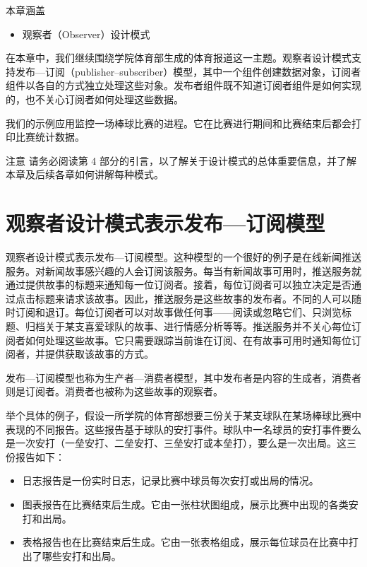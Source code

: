 \begin{myChapterIntro}{本章涵盖}
\begin{itemize}
\item 观察者（Observer）设计模式
\end{itemize}
\end{myChapterIntro}

在本章中，我们继续围绕学院体育部生成的体育报道这一主题。观察者设计模式支持发布—订阅（publisher–subscriber）模型，其中一个组件创建数据对象，订阅者组件以各自的方式独立处理这些对象。发布者组件既不知道订阅者组件是如何实现的，也不关心订阅者如何处理这些数据。

我们的示例应用监控一场棒球比赛的进程。它在比赛进行期间和比赛结束后都会打印比赛统计数据。


\begin{myWarning}{注意}
请务必阅读第 4 部分的引言，以了解关于设计模式的总体重要信息，并了解本章及后续各章如何讲解每种模式。
\end{myWarning}

\section{观察者设计模式表示发布—订阅模型}

观察者设计模式表示发布—订阅模型。这种模型的一个很好的例子是在线新闻推送服务。对新闻故事感兴趣的人会订阅该服务。每当有新闻故事可用时，推送服务就通过提供故事的标题来通知每一位订阅者。接着，每位订阅者可以独立决定是否通过点击标题来请求该故事。因此，推送服务是这些故事的发布者。不同的人可以随时订阅和退订。每位订阅者可以对故事做任何事——阅读或忽略它们、只浏览标题、归档关于某支喜爱球队的故事、进行情感分析等等。推送服务并不关心每位订阅者如何处理这些故事。它只需要跟踪当前谁在订阅、在有故事可用时通知每位订阅者，并提供获取该故事的方式。

发布—订阅模型也称为生产者—消费者模型，其中发布者是内容的生成者，消费者则是订阅者。消费者也被称为这些故事的观察者。

举个具体的例子，假设一所学院的体育部想要三份关于某支球队在某场棒球比赛中表现的不同报告。这些报告基于球队的安打事件。球队中一名球员的安打事件要么是一次安打（一垒安打、二垒安打、三垒安打或本垒打），要么是一次出局。这三份报告如下：

\begin{itemize}
\item 日志报告是一份实时日志，记录比赛中球员每次安打或出局的情况。
\item 图表报告在比赛结束后生成。它由一张柱状图组成，展示比赛中出现的各类安打和出局。
\item 表格报告也在比赛结束后生成。它由一张表格组成，展示每位球员在比赛中打出了哪些安打和出局。
\end{itemize}

